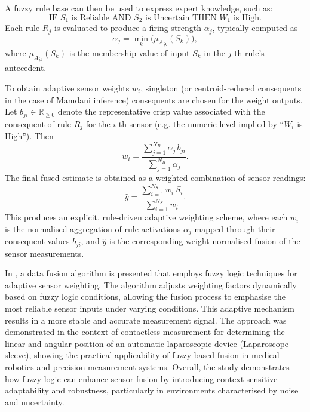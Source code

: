 \documentclass[journal]{IEEEtran}
\begin{document}
A fuzzy rule base can then be used to express expert knowledge, such as:
\[
\text{IF } S_1 \text{ is Reliable AND } S_2 \text{ is Uncertain THEN } W_1 \text{ is High.}
\]
Each rule $R_j$ is evaluated to produce a firing strength $\alpha_j$, typically computed as
\begin{equation}
\alpha_j = \min_k \big(\mu_{A_{jk}}(S_k)\big),
\end{equation}
where $\mu_{A_{jk}}(S_k)$ is the membership value of input $S_k$ in the $j$-th rule’s antecedent.

To obtain adaptive sensor weights $w_i$, singleton (or centroid-reduced consequents in the case of Mamdani inference) consequents are chosen for the weight outputs. Let $b_{ji} \in \mathbb{R}_{\ge 0}$ denote the representative crisp value associated with the consequent of rule $R_j$ for the $i$-th sensor (e.g. the numeric level implied by ``$W_i$ is High''). Then
\begin{equation}
w_i = \frac{\sum_{j=1}^{N_R} \alpha_j \, b_{ji}}{\sum_{j=1}^{N_R} \alpha_j}.
\end{equation}
The final fused estimate is obtained as a weighted combination of sensor readings:
\begin{equation}
\hat{y} = \frac{\sum_{i=1}^{N_S} w_i \, S_i}{\sum_{i=1}^{N_S} w_i}.
\end{equation}
This produces an explicit, rule-driven adaptive weighting scheme, where each $w_i$ is the normalised aggregation of rule activations $\alpha_j$ mapped through their consequent values $b_{ji}$, and $\hat{y}$ is the corresponding weight-normalised fusion of the sensor measurements.

In \cite{fracczak_fuzzylmw_2016}, a data fusion algorithm is presented that employs fuzzy logic techniques for adaptive sensor weighting. The algorithm adjusts weighting factors dynamically based on fuzzy logic conditions, allowing the fusion process to emphasise the most reliable sensor inputs under varying conditions. This adaptive mechanism results in a more stable and accurate measurement signal. The approach was demonstrated in the context of contactless measurement for determining the linear and angular position of an automatic laparoscopic device (Laparoscope sleeve), showing the practical applicability of fuzzy-based fusion in medical robotics and precision measurement systems. Overall, the study demonstrates how fuzzy logic can enhance sensor fusion by introducing context-sensitive adaptability and robustness, particularly in environments characterised by noise and uncertainty.
\end{document}

